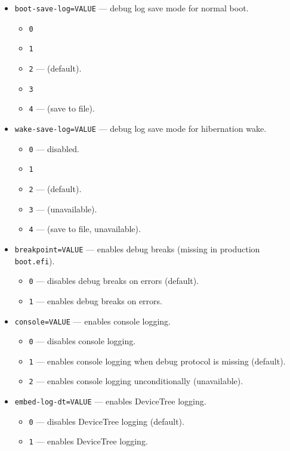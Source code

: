 \documentclass[]{article}
\begin{document}
\begin{itemize}
  \begin{itemize}
  \item \texttt{boot-save-log=VALUE} --- debug log save mode for normal boot.
    \begin{itemize}
    \item \texttt{0}
    \item \texttt{1}
    \item \texttt{2} --- (default).
    \item \texttt{3}
    \item \texttt{4} --- (save to file).
    \end{itemize}
  \item \texttt{wake-save-log=VALUE} --- debug log save mode for hibernation wake.
    \begin{itemize}
    \item \texttt{0} --- disabled.
    \item \texttt{1}
    \item \texttt{2} --- (default).
    \item \texttt{3} --- (unavailable).
    \item \texttt{4} --- (save to file, unavailable).
    \end{itemize}
  \item \texttt{breakpoint=VALUE} --- enables debug breaks (missing in production \texttt{boot.efi}).
    \begin{itemize}
    \item \texttt{0} --- disables debug breaks on errors (default).
    \item \texttt{1} --- enables debug breaks on errors.
    \end{itemize}
  \item \texttt{console=VALUE} --- enables console logging.
    \begin{itemize}
    \item \texttt{0} --- disables console logging.
    \item \texttt{1} --- enables console logging when debug protocol is missing (default).
    \item \texttt{2} --- enables console logging unconditionally (unavailable).
    \end{itemize}
  \item \texttt{embed-log-dt=VALUE} --- enables DeviceTree logging.
    \begin{itemize}
    \item \texttt{0} --- disables DeviceTree logging (default).
    \item \texttt{1} --- enables DeviceTree logging.

\end{itemize}
\end{itemize}
\end{itemize}
\end{document}
